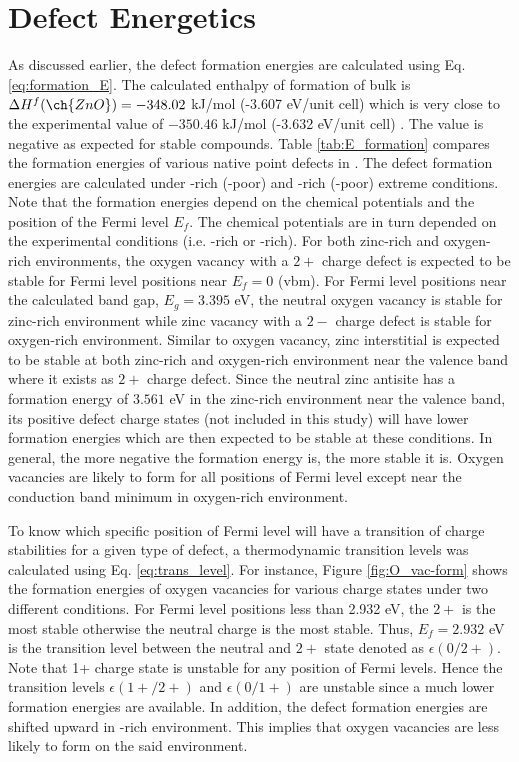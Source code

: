 \clearpage

\section{Defect Energetics}
As discussed earlier, the defect formation energies are calculated using Eq.  \eqref{eq:formation_E}. The calculated enthalpy of formation of bulk  is $\Delta H^f (\ch{ZnO}) = -348.02$ kJ/mol (-3.607 eV/unit cell) which is very close to the experimental value of $-350.46$ kJ/mol (-3.632 eV/unit cell) \citep{Medvedev1989}. The value is negative as expected for stable compounds. Table \ref{tab:E_formation} compares the formation energies of various native point defects in . The defect formation energies are calculated under  -rich (-poor) and -rich (-poor) extreme conditions. Note that the formation energies depend on the chemical potentials and the position of the Fermi level $E_f$. The chemical potentials are in turn depended on the experimental conditions (i.e. -rich or -rich). For both zinc-rich and oxygen-rich environments, the oxygen vacancy with a $2+$ charge defect is expected to be stable for Fermi level positions near $E_f = 0$ (vbm). For Fermi level positions near the calculated band gap, $E_g = 3.395$ eV, the neutral oxygen vacancy is stable for zinc-rich environment while zinc vacancy with a $2-$ charge defect is stable for oxygen-rich environment. Similar to oxygen vacancy, zinc interstitial is expected to be stable at both zinc-rich and oxygen-rich environment near the valence band where it exists as $2+$ charge defect. Since the  neutral zinc antisite has a formation energy of $3.561$ eV in the zinc-rich environment near the valence band, its positive defect charge states (not included in this study) will have lower formation energies  which are then expected to be stable at these conditions. In general, the more negative the formation energy is, the more stable it is. Oxygen vacancies are likely to form for all positions of Fermi level except near the conduction band minimum in oxygen-rich environment.

To know which specific position of Fermi level will have a transition of charge stabilities for a given type of defect, a thermodynamic transition levels was calculated using Eq. \eqref{eq:trans_level}. For instance, Figure \ref{fig:O_vac-form} shows the formation energies of oxygen vacancies for various charge states under two different conditions. For Fermi level positions less than 2.932 eV, the $2+$ is the most stable otherwise the neutral charge is the most stable. Thus, $E_f = 2.932$ eV is the transition level between the neutral and $2+$ state denoted as $\epsilon(0/2+)$. Note that 1+ charge state is unstable for any position of Fermi levels. Hence the transition levels $\epsilon(1+/2+)$ and $\epsilon(0/1+)$ are unstable since a much lower formation energies are available. In addition, the defect formation energies are shifted upward in -rich environment. This implies that oxygen vacancies are less likely to form on the said environment.

